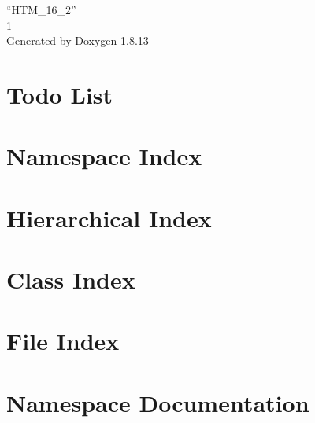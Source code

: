 \documentclass[twoside]{book}
\newcommand{\+}{\discretionary{\mbox{\scriptsize$\hookleftarrow$}}{}{}}
\newcommand{\clearemptydoublepage}{%
  \newpage{\pagestyle{empty}\cleardoublepage}%
}
\begin{document}
\hypersetup{pageanchor=false,
             bookmarksnumbered=true,
             pdfencoding=unicode
            }
\begin{titlepage}
\vspace*{7cm}
\begin{center}%
{\Large “\+H\+T\+M\+\_\+16\+\_\+2” \\[1ex]\large 1 }\\
\vspace*{1cm}
{\large Generated by Doxygen 1.8.13}\\
\end{center}
\end{titlepage}
\clearemptydoublepage
{}
\tableofcontents
\clearemptydoublepage
{}
\hypersetup{pageanchor=true}

\chapter{Todo List}
\label{todo}

\chapter{Namespace Index}

\chapter{Hierarchical Index}

\chapter{Class Index}

\chapter{File Index}

\chapter{Namespace Documentation}

\end{document}
